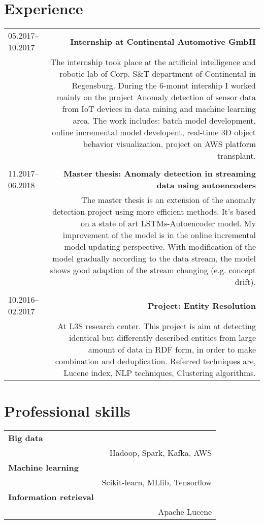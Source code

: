 \documentclass[10ptt]{article}
\begin{document}
\section*{Experience}
\begin{tabular}{L!{\VRule}R}
05.2017--10.2017&{\bf Internship at Continental Automotive GmbH}\\
&The internship took place at the artificial intelligence and robotic lab of Corp. S\&T department of Continental in Regensburg. During the 6-monat intership I worked mainly on the project Anomaly detection of sensor data from IoT devices in data mining and machine learning area. The work includes: batch model development, online incremental model developent, real-time 3D object behavior visualization, project on AWS platform transplant.\\
\\[5pt]
11.2017--06.2018&{\bf Master thesis: Anomaly detection in streaming data using autoencoders}\\
&The master thesis is an extension of the anomaly detection project using more efficient methods. It's based on a state of art LSTMs-Autoencoder model. My improvement of the model is in the online incremental model updating perspective. With modification of the model gradually according to the data stream, the model shows good adaption of the stream changing (e.g. concept drift).\\
\\[5pt]
10.2016--02.2017&{\bf Project: Entity Resolution}\\
&At L3S research center. This project is aim at detecting identical but differently described entities from large amount of data in RDF form, in order to make combination and deduplication. Referred techniques are, Lucene index, NLP techniques, Clustering algorithms.
\\[5pt]

\end{tabular}

\section*{Professional skills}
\begin{tabular}{L!{\VRule}R}
\bf Big data\\&{Hadoop, Spark, Kafka, AWS}\\[5pt]

\bf Machine learning\\&{Scikit-learn, MLlib, Tensorflow}\\[5pt]

\bf Information retrieval\\&{Apache Lucene}\\[5pt]


\end{tabular}
\end{document}
